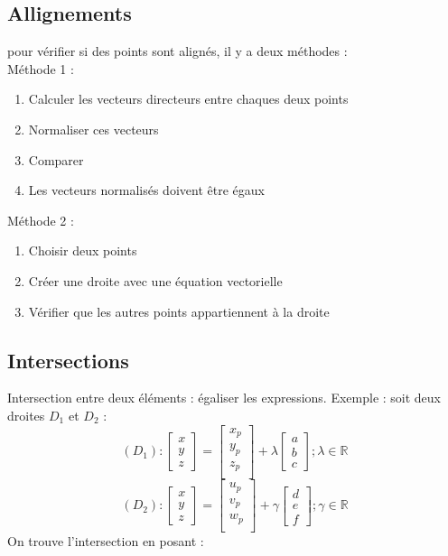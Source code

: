 \subsection{Allignements}
pour vérifier si des points sont alignés, il y a deux méthodes :\\
Méthode 1 : 
\begin{enumerate}
	\item Calculer les vecteurs directeurs entre chaques deux points
	\item Normaliser ces vecteurs
	\item Comparer
	\item Les vecteurs normalisés doivent être égaux
\end{enumerate}

Méthode 2 : 
\begin{enumerate}
	\item Choisir deux points
	\item Créer une droite avec une équation vectorielle
	\item Vérifier que les autres points appartiennent à la droite
\end{enumerate}

\subsection{Intersections}
Intersection entre deux éléments : égaliser les expressions.
\medbreak
Exemple : soit deux droites $D_1$ et $D_2$ :
\begin{equation}
(D_1):
\begin{bmatrix}
x \\
y\\
z
\end{bmatrix}
=
\begin{bmatrix}
x_p\\
y_p\\
z_p\\
\end{bmatrix}
+
\lambda
\begin{bmatrix}
a\\
b \\
c
\end{bmatrix}
; \lambda \in \mathbb{R}
\end{equation}
\begin{equation}
(D_2):
\begin{bmatrix}
x \\
y\\
z
\end{bmatrix}
=
\begin{bmatrix}
u_p\\
v_p\\
w_p\\
\end{bmatrix}
+
\gamma
\begin{bmatrix}
d\\
e \\
f
\end{bmatrix}
; \gamma \in \mathbb{R}
\end{equation}
On trouve l'intersection en posant :

